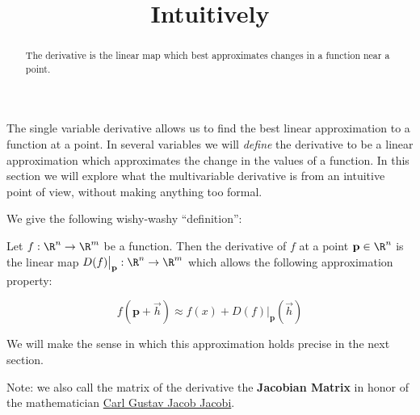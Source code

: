 \documentclass{ximera}
\title{Intuitively}
\begin{document}
\begin{abstract}
  The derivative is the linear map which best approximates changes in a function near a point.
\end{abstract}

The single variable derivative allows us to find the best linear
approximation to a function at a point.  In several variables we will
\textit{define} the derivative to be a linear approximation which
approximates the change in the values of a function.  In this section
we will explore what the multivariable derivative is from an intuitive
point of view, without making anything too formal.

We give the following wishy-washy ``definition'':

\begin{definition}
	Let $f:\R^n \to \R^m$ be a function.  Then the derivative of $f$ at a point $\mathbf{p} \in \R^n$ is the linear map $D(f)\big|_{\mathbf{p}}:\R^n \to \R^m$ 
	which allows the following approximation property:
	
	\[
		f(\mathbf{p} + \vec{h}) \approx f(x) + D(f)\big|_{\mathbf{p}}(\vec{h})
	\]
	
	We will make the sense in which this approximation holds precise in the next section.
\end{definition}

Note:  we also call the matrix of the derivative the \textbf{Jacobian Matrix} in honor of the mathematician 
\href{http://en.wikipedia.org/wiki/Carl_Gustav_Jacob_Jacobi}{Carl Gustav Jacob Jacobi}.
\end{document}
